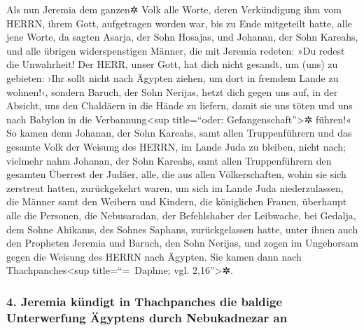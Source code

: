 Als nun Jeremia dem ganzen✲ Volk alle Worte, deren
Verkündigung ihm vom HERRN, ihrem Gott, aufgetragen worden war, bis zu
Ende mitgeteilt hatte, alle jene Worte, da sagten Asarja,
der Sohn Hosajas, und Johanan, der Sohn Kareahs, und alle übrigen
widerspenstigen Männer, die mit Jeremia redeten: »Du redest die
Unwahrheit! Der HERR, unser Gott, hat dich nicht gesandt, um (uns) zu
gebieten: ›Ihr sollt nicht nach Ägypten ziehen, um dort in fremdem Lande
zu wohnen!‹, sondern Baruch, der Sohn Nerijas, hetzt dich
gegen uns auf, in der Absicht, uns den Chaldäern in die Hände zu
liefern, damit sie uns töten und uns nach Babylon in die
Verbannung\textless sup title=``oder: Gefangenschaft''\textgreater✲
führen!« So kamen denn Johanan, der Sohn Kareahs, samt
allen Truppenführern und das gesamte Volk der Weisung des HERRN, im
Lande Juda zu bleiben, nicht nach; vielmehr nahm Johanan,
der Sohn Kareahs, samt allen Truppenführern den gesamten Überrest der
Judäer, alle, die aus allen Völkerschaften, wohin sie sich zerstreut
hatten, zurückgekehrt waren, um sich im Lande Juda niederzulassen,
die Männer samt den Weibern und Kindern, die königlichen
Frauen, überhaupt alle die Personen, die Nebusaradan, der Befehlshaber
der Leibwache, bei Gedalja, dem Sohne Ahikams, des Sohnes Saphans,
zurückgelassen hatte, unter ihnen auch den Propheten Jeremia und Baruch,
den Sohn Nerijas, und zogen im Ungehorsam gegen die
Weisung des HERRN nach Ägypten. Sie kamen dann nach
Thachpanches\textless sup title=``=~Daphne; vgl. 2,16''\textgreater✲.

\hypertarget{jeremia-kuxfcndigt-in-thachpanches-die-baldige-unterwerfung-uxe4gyptens-durch-nebukadnezar-an}{%
\subsubsection{4. Jeremia kündigt in Thachpanches die baldige
Unterwerfung Ägyptens durch Nebukadnezar
an}\label{jeremia-kuxfcndigt-in-thachpanches-die-baldige-unterwerfung-uxe4gyptens-durch-nebukadnezar-an}}

